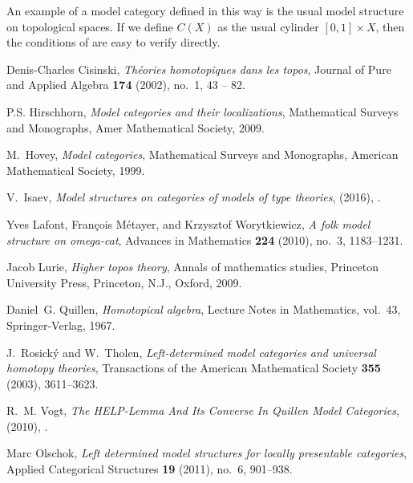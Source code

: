 \documentclass{tac}
\theoremstyle{definition}
\begin{document}
\begin{exmp}
An example of a model category defined in this way is the usual model structure on topological spaces.
If we define $C(X)$ as the usual cylinder $[0,1] \times X$, then the conditions of  are easy to verify directly.
\end{exmp}

\begin{references*}

Denis-Charles Cisinski, \emph{Théories homotopiques dans les topos}, Journal
  of Pure and Applied Algebra \textbf{174} (2002), no.~1, 43 -- 82.

P.S. Hirschhorn, \emph{Model categories and their localizations}, Mathematical
  Surveys and Monographs, Amer Mathematical Society, 2009.

M.~Hovey, \emph{Model categories}, Mathematical Surveys and Monographs,
  American Mathematical Society, 1999.

V.~{Isaev}, \emph{Model structures on categories of models of type theories},
  (2016), \href {http://arxiv.org/abs/1607.07407} {}.

Yves Lafont, Fran{\c c}ois M{\'e}tayer, and Krzysztof Worytkiewicz, \emph{{A
  folk model structure on omega-cat}}, Advances in Mathematics \textbf{224}
  (2010), no.~3, 1183--1231.

Jacob Lurie, \emph{Higher topos theory}, Annals of mathematics studies,
  Princeton University Press, Princeton, N.J., Oxford, 2009.

Daniel~G. Quillen, \emph{Homotopical algebra}, Lecture Notes in Mathematics,
  vol.~43, Springer-Verlag, 1967.

J.~Rosick{\'y} and W.~Tholen, \emph{Left-determined model categories and
  universal homotopy theories}, Transactions of the American Mathematical
  Society \textbf{355} (2003), 3611--3623.

R.~M. Vogt, \emph{{The HELP-Lemma And Its Converse In Quillen Model
  Categories}},  (2010), \href {http://arxiv.org/abs/1004.5249}
  {}.

Marc Olschok, \emph{Left determined model structures for locally presentable
  categories}, Applied Categorical Structures \textbf{19} (2011), no.~6,
  901--938.

\end{references*}
\end{document}
